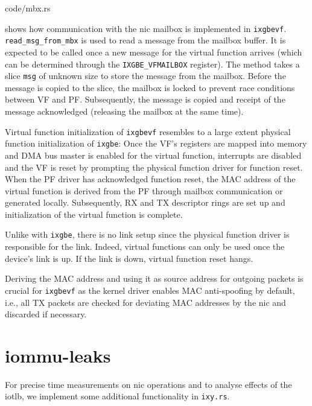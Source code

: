 \begin{minipage}{\textwidth}
     {code/mbx.rs}
\end{minipage}

 shows how communication with the \ac{nic} mailbox is
implemented in \texttt{ixgbevf}. \linebreak \texttt{read\_msg\_from\_mbx} is
used to read a message from the mailbox buffer. It is expected to be called once
a new message for the virtual function arrives (which can be determined through
the \texttt{IXGBE\_VFMAILBOX} register). The method takes a slice \texttt{msg}
of unknown size to store the message from the mailbox. Before the message is
copied to the slice, the mailbox is locked to prevent race conditions between VF
and PF. Subsequently, the message is copied and receipt of the message
acknowledged (releasing the mailbox at the same time).

Virtual function initialization of \texttt{ixgbevf} resembles to a large extent
physical function initialization of \texttt{ixgbe}: Once the VF's registers are
mapped into memory and DMA bus master is enabled for the virtual function,
interrupts are disabled and the VF is reset by prompting the physical function
driver for function reset. When the PF driver has acknowledged function reset,
the MAC address of the virtual function is derived from the PF through mailbox
communication or generated locally. Subsequently, RX and TX descriptor rings are
set up and initialization of the virtual function is complete.

Unlike with \texttt{ixgbe}, there is no link setup since the physical function
driver is responsible for the link. Indeed, virtual functions can only be used
once the device's link is up. If the link is down, virtual function reset hangs.

Deriving the MAC address and using it as source address for outgoing packets is
crucial for \texttt{ixgbevf} as the kernel driver enables MAC anti-spoofing by
default, i.e., all TX packets are checked for deviating MAC addresses by the
\ac{nic} and discarded if necessary.


\section{iommu-leaks}
\label{sec:iommu_leaks}

For precise time measurements on \ac{nic} operations and to analyse effects of
the \ac{iotlb}, we implement some additional functionality in \texttt{ixy.rs}.

